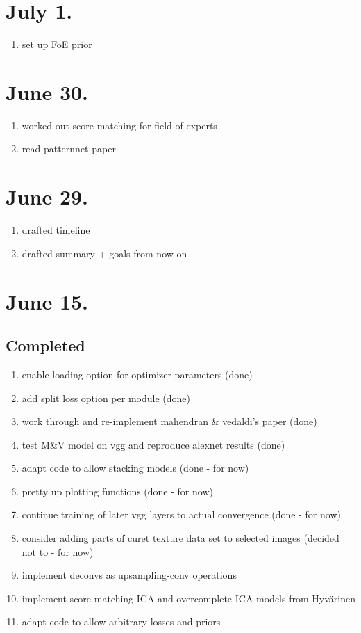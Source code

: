 \documentclass{article}
\begin{document}
\section*{July 1.}

\begin{enumerate}
	\item set up FoE prior
\end{enumerate}


\section*{June 30.}

\begin{enumerate}
	\item worked out score matching for field of experts 
	\item read patternnet paper	
\end{enumerate}

\section*{June 29.}

\begin{enumerate}
	\item drafted timeline
	\item drafted summary + goals from now on
\end{enumerate}

\section*{June 15.}

\subsection*{Completed}

\begin{enumerate}
    \item enable loading option for optimizer parameters (done)
    \item  add split loss option per module (done)
    \item  work through and re-implement mahendran \& vedaldi's paper (done)
    \item  test M\&V model on vgg and reproduce alexnet results (done)
    \item  adapt code to allow stacking models (done - for now)
    \item  pretty up plotting functions (done - for now)
    \item  continue training of later vgg layers to actual convergence (done - for now)
    \item  consider adding parts of curet texture data set to selected images (decided not to - for now)
    \item implement deconvs as upsampling-conv operations
    \item implement score matching ICA and overcomplete ICA models from Hyvärinen
    \item adapt code to allow arbitrary losses and priors
\end{enumerate}
\end{document}
